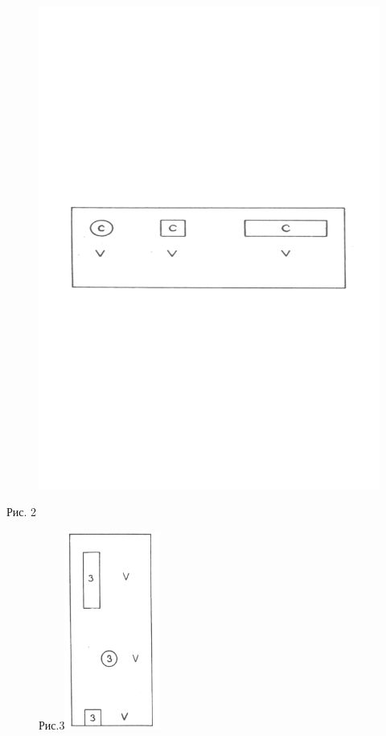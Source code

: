 \documentclass[a5paper]{book}
\begin{document}
\begin{figure}
\centering
\includegraphics[width=\linewidth]{media/media/image2.png}
\end{figure}


Рис. 2

\begin{figure}
\centering
Рис.3\includegraphics[width=1.24028in,height=2.56319in]{media/media/image3.jpg}
\end{figure}
\end{document}
